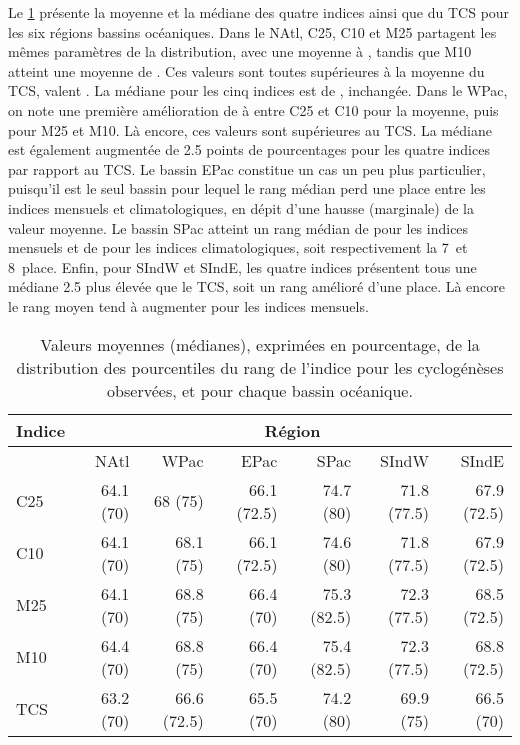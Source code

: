 \documentclass[../main.tex]{subfiles}
\begin{document}
Le \cref{tab:percentiles_indices_all} présente la moyenne et la médiane des quatre indices ainsi que du TCS pour les six régions bassins océaniques. Dans le
NAtl, C25, C10 et M25 partagent les mêmes paramètres de la distribution, avec une moyenne à , tandis que M10 atteint une moyenne de . Ces
valeurs sont toutes supérieures à la moyenne du TCS, valent . La médiane pour les cinq indices est de , inchangée. Dans le WPac, on note une
première amélioration de  à  entre C25 et C10 pour la moyenne, puis  pour M25 et M10. Là encore, ces valeurs sont supérieures au
TCS. La médiane est également augmentée de \num{2.5} points de pourcentages pour les quatre indices par rapport au TCS. Le bassin EPac constitue un cas un peu
plus particulier, puisqu'il est le seul bassin pour lequel le rang médian perd une place entre les indices mensuels et climatologiques, en dépit d'une hausse
(marginale) de la valeur moyenne. Le bassin SPac atteint un rang médian de  pour les indices mensuels et de  pour les indices
climatologiques, soit respectivement la \num{7}\ieme~et \num{8}\ieme~place. Enfin, pour SIndW et SIndE, les quatre indices présentent tous une médiane \num{2.5}
plus élevée que le TCS, soit un rang amélioré d'une place. Là encore le rang moyen tend à augmenter pour les indices mensuels.

\begin{table}[tb]
    \centering
    \caption{Valeurs moyennes (médianes), exprimées en pourcentage, de la distribution des pourcentiles du rang de l'indice pour les cyclogénèses observées, et
    pour chaque bassin océanique.}
    \begin{tabular}{lrrrrrr}
        \toprule\toprule
        Indice & \multicolumn{6}{c}{Région}\\
        \midrule
               & NAtl & WPac & EPac & SPac & SIndW & SIndE \\
        \midrule 
        C25 & \num{64.1} (\num{70}) & \num{68} (\num{75}) & \num{66.1} (\num{72.5}) & \num{74.7} (\num{80}) & \num{71.8} (\num{77.5}) & \num{67.9} (\num{72.5}) \\
        C10 & \num{64.1} (\num{70}) & \num{68.1} (\num{75}) & \num{66.1} (\num{72.5}) & \num{74.6} (\num{80}) & \num{71.8} (\num{77.5}) & \num{67.9} (\num{72.5}) \\
        M25 & \num{64.1} (\num{70}) & \num{68.8} (\num{75}) & \num{66.4} (\num{70}) & \num{75.3} (\num{82.5}) & \num{72.3} (\num{77.5}) & \num{68.5} (\num{72.5}) \\
        M10 & \num{64.4} (\num{70}) & \num{68.8} (\num{75})& \num{66.4} (\num{70}) & \num{75.4} (\num{82.5}) & \num{72.3} (\num{77.5}) & \num{68.8} (\num{72.5}) \\
        \midrule
        TCS & \num{63.2} (\num{70}) & \num{66.6} (\num{72.5}) & \num{65.5} (\num{70}) & \num{74.2} (\num{80}) & \num{69.9} (\num{75}) & \num{66.5} (\num{70}) \\
        \bottomrule
    \end{tabular}
    \label{tab:percentiles_indices_all}
\end{table}
\end{document}
